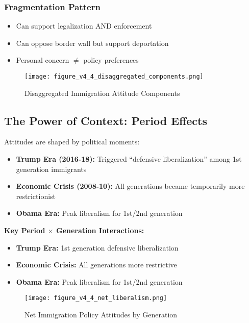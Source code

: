 \documentclass[11pt,letterpaper]{article}
\begin{document}
\subsubsection{Fragmentation Pattern}
\begin{itemize}
    \item Can support legalization AND enforcement
    \item Can oppose border wall but support deportation
    \item Personal concern $\neq$ policy preferences
\end{itemize}

\begin{figure}[H]
    \centering
    \texttt{[image: figure\_v4\_4\_disaggregated\_components.png]}
    \caption{Disaggregated Immigration Attitude Components}
    \label{fig:disaggregated}
\end{figure}

\subsection{The Power of Context: Period Effects}

Attitudes are shaped by political moments:
\begin{itemize}
    \item \textbf{Trump Era (2016-18):} Triggered ``defensive liberalization'' among 1st generation immigrants
    \item \textbf{Economic Crisis (2008-10):} All generations became temporarily more restrictionist
    \item \textbf{Obama Era:} Peak liberalism for 1st/2nd generation
\end{itemize}

\textbf{Key Period $\times$ Generation Interactions:}
\begin{itemize}
    \item \textbf{Trump Era:} 1st generation defensive liberalization
    \item \textbf{Economic Crisis:} All generations more restrictive
    \item \textbf{Obama Era:} Peak liberalism for 1st/2nd generation
\end{itemize}

\begin{figure}[H]
    \centering
    \texttt{[image: figure\_v4\_4\_net\_liberalism.png]}
    \caption{Net Immigration Policy Attitudes by Generation}
    \label{fig:net_liberalism}
\end{figure}
\end{document}
